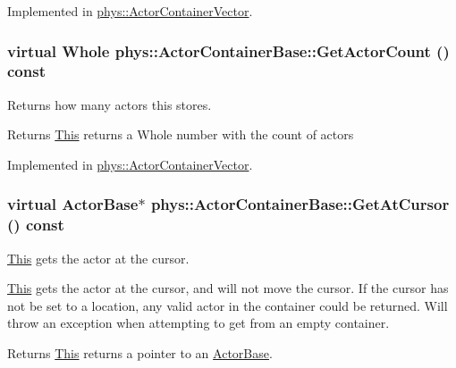 Implemented in \hyperlink{classphys_1_1ActorContainerVector_ad01cf1452bda36cee175ae0e54d509cc}{phys::ActorContainerVector}.

\hypertarget{classphys_1_1ActorContainerBase_aa5ec651d4634b2d90efe2a76f9d2fbdd}{
\subsubsection[{GetActorCount}]{\setlength{\rightskip}{0pt plus 5cm}virtual {\bf Whole} phys::ActorContainerBase::GetActorCount () const}}
\label{d1/d00/classphys_1_1ActorContainerBase_aa5ec651d4634b2d90efe2a76f9d2fbdd}


Returns how many actors this stores. 

\begin{DoxyReturn}{Returns}
\hyperlink{structThis}{This} returns a Whole number with the count of actors 
\end{DoxyReturn}


Implemented in \hyperlink{classphys_1_1ActorContainerVector_a6d2e5e68e23f5798ad10ba41e479d0f7}{phys::ActorContainerVector}.

\hypertarget{classphys_1_1ActorContainerBase_a2c8fb86a9e188aece105b2a753ccc19a}{
\subsubsection[{GetAtCursor}]{\setlength{\rightskip}{0pt plus 5cm}virtual {\bf ActorBase}$\ast$ phys::ActorContainerBase::GetAtCursor () const}}
\label{d1/d00/classphys_1_1ActorContainerBase_a2c8fb86a9e188aece105b2a753ccc19a}


\hyperlink{structThis}{This} gets the actor at the cursor. 

\hyperlink{structThis}{This} gets the actor at the cursor, and will not move the cursor. If the cursor has not be set to a location, any valid actor in the container could be returned. Will throw an exception when attempting to get from an empty container. \begin{DoxyReturn}{Returns}
\hyperlink{structThis}{This} returns a pointer to an \hyperlink{classphys_1_1ActorBase}{ActorBase}. 
\end{DoxyReturn}



